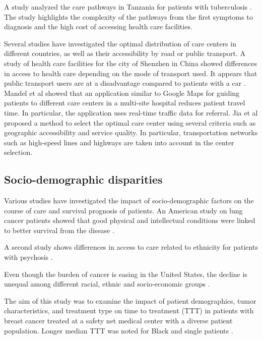 A study analyzed the care pathways in Tanzania for patients with tuberculosis \cite{mhalu_pathways_2019}. The study highlights the complexity of the pathways from the first symptoms to diagnosis and the high cost of accessing health care facilities.

Several studies have investigated the optimal distribution of care centers in different countries, as well as their accessibility by road or public transport. A study of health care facilities for the city of Shenzhen in China showed differences in access to health care depending on the mode of transport used. It appears that public transport users are at a disadvantage compared to patients with a car \cite{tao_spatial_2018}. Mandel et al \cite{mandel_optimizing_2018} showed that an application similar to Google Maps for guiding patients to different care centers in a multi-site hospital reduces patient travel time. In particular, the application uses real-time traffic data for referral. Jia et al \cite{jia_selecting_2014} proposed a method to select the optimal care center using several criteria such as geographic accessibility and service quality. In particular, transportation networks such as high-speed lines and highways are taken into account in the center selection.

\subsection*{Socio-demographic disparities}

Various studies have investigated the impact of socio-demographic factors on the course of care and survival prognosis of patients. An American study on lung cancer patients showed that good physical and intellectual conditions were linked to better survival from the disease \cite{pierzynski_socio-demographic_2018}.

A second study shows differences in access to care related to ethnicity for patients with psychosis \cite{anderson_meta-analysis_2014}.

Even though the burden of cancer is easing in the United States, the decline is unequal among different racial, ethnic and socio-economic groups \cite{viswanath_science_2005}.

The aim of this study was to examine the impact of patient demographics, tumor characteristics, and treatment type on time to treatment (TTT) in patients with breast cancer treated at a safety net medical center with a diverse patient population. Longer median TTT was noted for Black and single patients \cite{khanna_impact_2017}.

